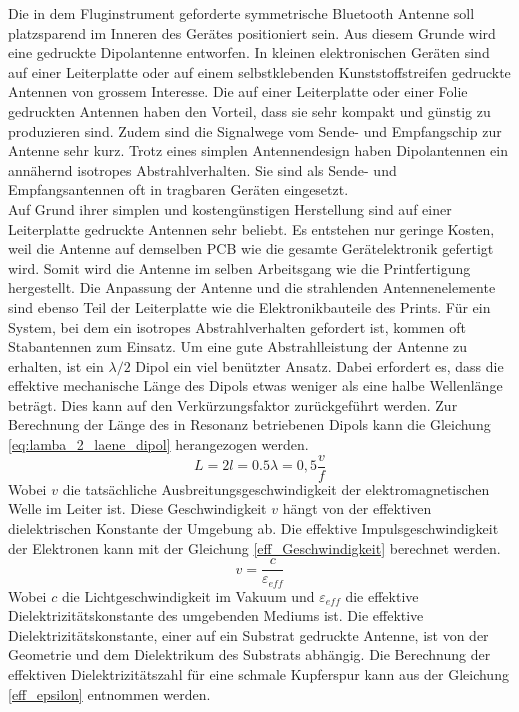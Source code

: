 Die in dem Fluginstrument geforderte symmetrische Bluetooth Antenne soll platzsparend im Inneren des Gerätes positioniert sein. Aus diesem Grunde wird eine gedruckte Dipolantenne entworfen. In kleinen elektronischen Geräten sind auf einer Leiterplatte oder auf einem selbstklebenden Kunststoffstreifen gedruckte Antennen von grossem Interesse. Die auf einer Leiterplatte oder einer Folie gedruckten Antennen haben den Vorteil, dass sie sehr kompakt und günstig zu produzieren sind. Zudem sind die Signalwege vom Sende- und Empfangschip zur Antenne sehr kurz. Trotz eines simplen Antennendesign haben Dipolantennen ein annähernd isotropes Abstrahlverhalten. Sie sind als Sende- und Empfangsantennen oft in  tragbaren Geräten eingesetzt. \\

Auf Grund ihrer simplen und kostengünstigen Herstellung sind auf einer Leiterplatte gedruckte Antennen sehr beliebt. Es entstehen nur geringe Kosten, weil die Antenne auf demselben PCB wie die gesamte Gerätelektronik gefertigt wird. Somit wird die Antenne im selben Arbeitsgang wie die Printfertigung hergestellt. Die  Anpassung der Antenne und die strahlenden Antennenelemente sind ebenso Teil der Leiterplatte wie die Elektronikbauteile des Prints. Für ein System, bei dem ein isotropes Abstrahlverhalten gefordert ist, kommen oft Stabantennen zum Einsatz. Um eine gute Abstrahlleistung der Antenne zu erhalten, ist ein $\lambda /2$ Dipol ein viel benützter Ansatz. Dabei erfordert es, dass die effektive mechanische Länge des Dipols etwas weniger als eine halbe Wellenlänge beträgt. Dies kann auf den Verkürzungsfaktor zurückgeführt werden. 
Zur Berechnung der Länge des in Resonanz betriebenen Dipols kann die  Gleichung \ref{eq:lamba_2_laene_dipol} herangezogen werden.
\begin{equation}\label{eq:lamba_2_laene_dipol}
L=2l = 0.5 \lambda= 0,5 \dfrac{v}{f}
\end{equation} 
Wobei $v$ die tatsächliche Ausbreitungsgeschwindigkeit der elektromagnetischen Welle im Leiter ist. Diese Geschwindigkeit $v$ hängt von der effektiven dielektrischen Konstante der Umgebung  ab. 
Die effektive  Impulsgeschwindigkeit der Elektronen kann mit der Gleichung \ref{eff_Geschwindigkeit} berechnet werden. 
\begin{equation}\label{eff_Geschwindigkeit}
v = \dfrac{c}{\varepsilon_{eff}}
\end{equation}
Wobei $c$ die Lichtgeschwindigkeit im Vakuum und $\varepsilon_{eff}$  die effektive Dielektrizitätskonstante des umgebenden Mediums ist. Die effektive Dielektrizitätskonstante, einer auf ein Substrat gedruckte Antenne, ist von der  Geometrie und dem Dielektrikum des Substrats abhängig. Die Berechnung der effektiven Dielektrizitätszahl für eine schmale Kupferspur kann aus der Gleichung \ref{eff_epsilon} entnommen werden. 

